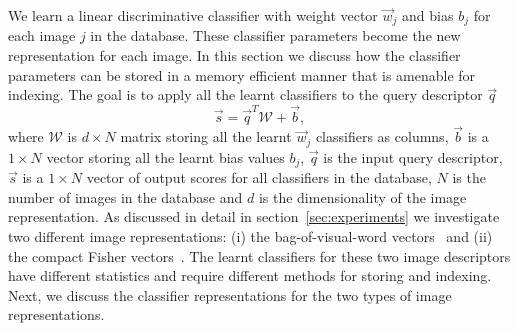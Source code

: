   We learn a linear discriminative classifier with weight vector $\vec{w}_j$ and bias $b_j$ for each image $j$ in the database.   
  These classifier parameters become the new representation for each image. 
  In this section we discuss how the classifier parameters can be stored in a memory efficient manner that is amenable for indexing. 
  The goal is to apply all the learnt classifiers to the query descriptor $\vec{q}$
      \begin{equation}
      \label{eq:allscores}
        \vec{s}=\vec{q}^T \mathcal{W}+\vec{b}, %
      \end{equation}
  where $\mathcal{W}$ is $d\times N$ matrix storing all the learnt $\vec{w}_j$ classifiers as columns, $\vec{b}$ is a $1\times N$ vector storing all the learnt bias values $b_j$, 
  $\vec{q}$ is the input query descriptor, $\vec{s}$ is a $1\times N$ vector of output scores for all classifiers in the database, $N$ is the number of images in the database  and $d$ is the dimensionality of the image representation. 
  As discussed in detail in section~\ref{sec:experiments} we investigate two different image representations:  (i) the bag-of-visual-word vectors~\cite{Sivic03} and (ii) the compact Fisher vectors~\cite{Jegou12}. The learnt classifiers for these two image descriptors have different statistics and require different methods for storing and indexing. Next, we discuss the classifier representations for the two types of image representations.
 
